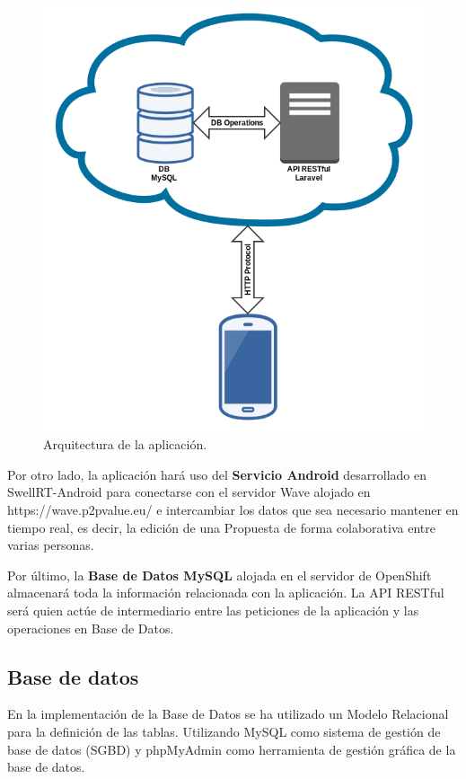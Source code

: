 \begin{figure}[H]
\centering
\includegraphics[keepaspectratio, scale=0.4]{Media/Captures/architecture.png}
\caption{Arquitectura de la aplicación.}
\label{fig:architecture}
\end{figure}

Por otro lado, la aplicación hará uso del \textbf{Servicio Android} desarrollado en SwellRT-Android \cite{ref:swellRT_android_github} para conectarse con el servidor Wave alojado en https://wave.p2pvalue.eu/ e intercambiar los datos que sea necesario mantener en tiempo real, es decir, la edición de una Propuesta de forma colaborativa entre varias personas.

Por último, la \textbf{Base de Datos MySQL} alojada en el servidor de OpenShift almacenará toda la información relacionada con la aplicación. La API RESTful será quien actúe de intermediario entre las peticiones de la aplicación y las operaciones en Base de Datos.

\subsection{Base de datos}

En la implementación de la Base de Datos se ha utilizado un Modelo Relacional para la definición de las tablas. Utilizando MySQL \cite{ref:mysql} como sistema de gestión de base de datos (SGBD) y phpMyAdmin \cite{ref:phpMyAdmin} como herramienta de gestión gráfica de la base de datos.

